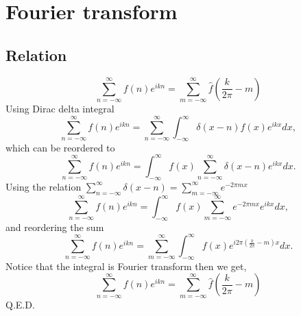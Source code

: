 \documentclass[12pt,twoside,english]{book}
\renewcommand{\~}{\perispomeni}%
\numberwithin{equation}{section}
\numberwithin{figure}{section}
\begin{document}
%


\chapter{Fourier transform}

\section{Relation}
\begin{equation}
\sum_{n=-\infty}^{\infty}f\left(n\right)e^{ikn}=\sum_{m=-\infty}^{\infty}\hat{f}\left(\frac{k}{2\pi}-m\right)
\label{eq:fourier series relation}
\end{equation}
Using Dirac delta integral
\[
\sum_{n=-\infty}^{\infty}f\left(n\right)e^{ikn}=\sum_{n=-\infty}^{\infty}\int_{-\infty}^{\infty}\delta\left(x-n\right)f\left(x\right)e^{ikx}dx,\]
which can be reordered to
\[
\sum_{n=-\infty}^{\infty}f\left(n\right)e^{ikn}=\int_{-\infty}^{\infty}f\left(x\right)\sum_{n=-\infty}^{\infty}\delta\left(x-n\right)e^{ikx}dx.\]
Using the relation $\sum_{n=-\infty}^{\infty}\delta\left(x-n\right)=\sum_{m=-\infty}^{\infty}e^{-2\pi mx}$
\[
\sum_{n=-\infty}^{\infty}f\left(n\right)e^{ikn}=\int_{-\infty}^{\infty}f\left(x\right)\sum_{m=-\infty}^{\infty}e^{-2\pi mx}e^{ikx}dx,\]
and reordering the sum\[
\sum_{n=-\infty}^{\infty}f\left(n\right)e^{ikn}=\sum_{m=-\infty}^{\infty}\int_{-\infty}^{\infty}f\left(x\right)e^{i2\pi\left(\frac{k}{2\pi}-m\right)x}dx.\]
Notice that the integral is Fourier transform then we get,\[
\sum_{n=-\infty}^{\infty}f\left(n\right)e^{ikn}=\sum_{m=-\infty}^{\infty}\hat{f}\left(\frac{k}{2\pi}-m\right)\]
Q.E.D.
\end{document}

